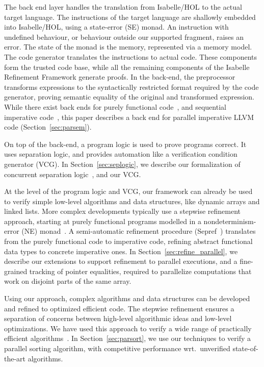 \documentclass[a4paper,UKenglish,cleveref, autoref, thm-restate]{lipics-v2021}
\begin{document}
The back end layer handles the translation from Isabelle/HOL to the actual target language.
The instructions of the target language are shallowly embedded into Isabelle/HOL, using
a state-error (SE) monad. An instruction with undefined behaviour,
or behaviour outside our supported fragment, raises an error.
The state of the monad is the memory, represented via a memory model.
The code generator translates the instructions to actual code.
These components form the trusted code base, while all the remaining components of the
Isabelle Refinement Framework generate proofs. In the back-end, the preprocessor transforms
expressions to the syntactically restricted format required by the code generator,
proving semantic equality of the original and transformed expression.
While there exist back ends for purely functional code~\cite{LaTu12,La13},
and sequential imperative code~\cite{La15,La19-llvm}, this paper describes a back end
for parallel imperative LLVM code (Section~\ref{sec:parsem}).

On top of the back-end, a program logic is used to prove programs correct.
It uses separation logic, and provides automation like a verification condition generator (VCG).
In Section~\ref{sec:seplogic}, we describe our formalization of concurrent separation logic~\cite{OH04}, and our VCG.

At the level of the program logic and VCG, our framework can already be used to verify simple low-level algorithms and data structures,
like dynamic arrays and linked lists. More complex developments typically use a stepwise refinement approach,
starting at purely functional programs modelled in a nondeterminism-error (NE) monad~\cite{LaTu12}.
A semi-automatic refinement procedure (Sepref~\cite{La15,La19-llvm}) translates from the purely functional
code to imperative code, refining abstract functional data types to concrete imperative ones.
In Section~\ref{sec:refine_parallel}, we describe our extensions to support refinement to parallel executions,
and a fine-grained tracking of pointer equalities, required to parallelize computations that work on
disjoint parts of the same array.

Using our approach, complex algorithms and data structures can be developed and
refined to optimized efficient code. The stepwise refinement ensures a separation of concerns
between high-level algorithmic ideas and low-level optimizations. We have used this approach to
verify a wide range of practically efficient algorithms~\cite{ELNN13,BrLa18,WiLa18,La17_CADE,La17_SAT,FBL18,La14,LaSe16,LaSe19,La20}.
In Section~\ref{sec:parsort}, we use our techniques to verify a parallel sorting algorithm,
with competitive performance wrt.\ unverified state-of-the-art algorithms.
\end{document}
